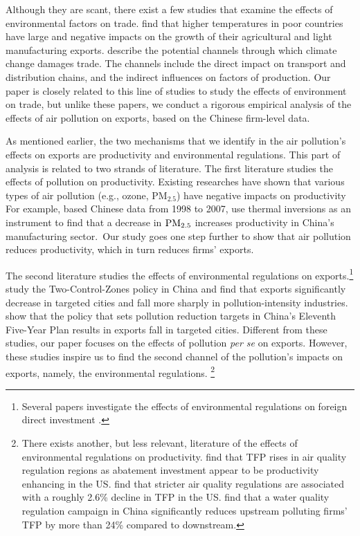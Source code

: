 \documentclass[12pt]{article}
\begin{document}
Although they are scant, there exist a few studies that examine the effects
of environmental factors on trade. \cite{jones2010climate} find that higher
temperatures in poor countries have large and negative impacts on the growth
of their agricultural and light manufacturing exports. \cite%
{dellink2017international} describe the potential channels through which
climate change damages trade. The channels include the direct impact on
transport and distribution chains, and the indirect influences on factors of
production. Our paper is closely related to this line of studies to study
the effects of environment on trade, but unlike these papers, we conduct a
rigorous empirical analysis of the effects of air pollution on exports,
based on the Chinese firm-level data.

As mentioned earlier, the two mechanisms that we identify in the air
pollution's effects on exports are productivity and environmental
regulations. This part of analysis is related to two strands of literature.
The first literature studies the effects of pollution on productivity.
Existing researches have shown that various types of air pollution (e.g.,
ozone, $\mathrm{PM_{2.5}}$) have negative impacts on productivity %
\citep{graff2012impact,chang2016particulate,fu2021air,adhvaryu2022management}
For example, based Chinese data from 1998 to 2007, \cite{fu2021air} use
thermal inversions as an instrument to find that a decrease in $\mathrm{%
PM_{2.5}}$ increases productivity in China's manufacturing sector.\ Our
study goes one step further to show that air pollution reduces productivity,
which in turn reduces firms' exports.

The second literature studies the effects of environmental regulations on
exports.\footnote{%
Several papers investigate the effects of environmental regulations on
foreign direct investment \citep{dean2009foreign,cai2016does}.} \cite%
{hering2014environmental} study the Two-Control-Zones policy in China and
find that exports significantly decrease in targeted cities and fall more
sharply in pollution-intensity industries. \cite{shi2018environmental} show
that the policy that sets pollution reduction targets in China's Eleventh
Five-Year Plan results in exports fall in targeted cities. Different from
these studies, our paper focuses on the effects of pollution \textit{per se}
on exports. However, these studies inspire us to find the second channel of
the pollution's impacts on exports, namely, the environmental regulations.%
\footnote{%
There exists another, but less relevant, literature of the effects of
environmental regulations on productivity. \cite{berman2001environmental}
find that TFP rises in air quality regulation regions as abatement
investment appear to be productivity enhancing in the US. \cite{NBERw18392}
find that stricter air quality regulations are associated with a roughly
2.6\% decline in TFP in the US. \cite{he2020watering} find that a water
quality regulation campaign in China significantly reduces upstream
polluting firms' TFP by more than 24\% compared to downstream.}
\end{document}
